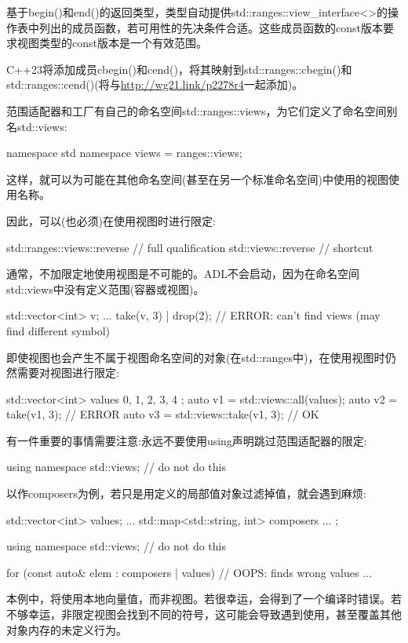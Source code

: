 基于begin()和end()的返回类型，类型自动提供std::ranges::view\_interface<>的操作表中列出的成员函数，若可用性的先决条件合适。这些成员函数的const版本要求视图类型的const版本是一个有效范围。

C++23将添加成员cbegin()和cend()，将其映射到std::ranges::cbegin()和std::ranges::cend()(将与\url{http://wg21.link/p2278r4}一起添加)。


范围适配器和工厂有自己的命名空间std::ranges::views，为它们定义了命名空间别名std::views:

\begin{cpp}
namespace std {
	namespace views = ranges::views;
}
\end{cpp}

这样，就可以为可能在其他命名空间(甚至在另一个标准命名空间)中使用的视图使用名称。

因此，可以(也必须)在使用视图时进行限定:

\begin{cpp}
std::ranges::views::reverse // full qualification
std::views::reverse // shortcut
\end{cpp}

通常，不加限定地使用视图是不可能的。ADL不会启动，因为在命名空间std::views中没有定义范围(容器或视图)。

\begin{cpp}
std::vector<int> v;
...
take(v, 3) | drop(2); // ERROR: can’t find views (may find different symbol)
\end{cpp}

即使视图也会产生不属于视图命名空间的对象(在std::ranges中)，在使用视图时仍然需要对视图进行限定:

\begin{cpp}
std::vector<int> values{ 0, 1, 2, 3, 4 };
auto v1 = std::views::all(values);
auto v2 = take(v1, 3); // ERROR
auto v3 = std::views::take(v1, 3); // OK
\end{cpp}

有一件重要的事情需要注意:永远不要使用using声明跳过范围适配器的限定:

\begin{cpp}
using namespace std::views; // do not do this
\end{cpp}

以作composers为例，若只是用定义的局部值对象过滤掉值，就会遇到麻烦:

\begin{cpp}
std::vector<int> values;
...
std::map<std::string, int> composers{ ... };

using namespace std::views; // do not do this

for (const auto& elem : composers | values) { // OOPS: finds wrong values
	...
}
\end{cpp}

本例中，将使用本地向量值，而非视图。若很幸运，会得到了一个编译时错误。若不够幸运，非限定视图会找到不同的符号，这可能会导致遇到使用，甚至覆盖其他对象内存的未定义行为。
